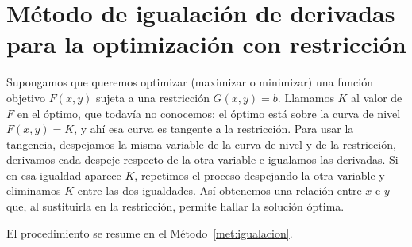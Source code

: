 \documentclass{article}
\begin{document}
 
\section*{Método de igualación de derivadas para la optimización con restricción}
 
Supongamos que queremos optimizar (maximizar o minimizar) una función objetivo \(F(x,y)\) sujeta a una restricción \(G(x,y)=b\). Llamamos \(K\) al valor de \(F\) en el óptimo, que todavía no conocemos: el óptimo está sobre la curva de nivel \(F(x,y)=K\), y ahí esa curva es tangente a la restricción. Para usar la tangencia, despejamos la misma variable de la curva de nivel y de la restricción, derivamos cada despeje respecto de la otra variable e igualamos las derivadas. Si en esa igualdad aparece \(K\), repetimos el proceso despejando la otra variable y eliminamos \(K\) entre las dos igualdades. Así {\color{teal}obtenemos una relación entre \(x\) e \(y\) que, al sustituirla en la restricción, permite hallar la solución óptima.}
 
El procedimiento se resume en el Método~\ref{met:igualacion}.
 
\end{document}
